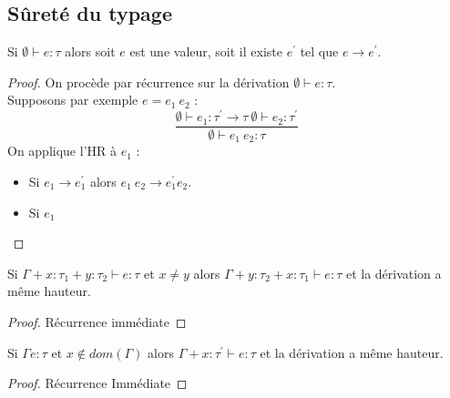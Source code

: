 \documentclass{cours}
\begin{document}
\subsection{Sûreté du typage}
\begin{lemma}[Progression]
    Si $\emptyset \vdash e : \tau$ alors soit $e$ est une valeur, soit il existe $e^{'}$ tel que $e \rightarrow e^{'}$.    
\end{lemma}
\begin{proof}
    On procède par récurrence sur la dérivation $\emptyset \vdash e : \tau$.\\
    Supposons par exemple $e = e_{1} \ e_{2}$ : 
    \[
        \frac{\emptyset \vdash e_{1} : \tau^{'} \rightarrow \tau \ \emptyset \vdash e_{2} : \tau^{'}}{\emptyset \vdash e_{1} \ e_{2} : \tau}
    \]
    On applique l'HR à $e_{1}$ : 
    \begin{itemize}
        \item Si $e_{1} \rightarrow e_{1}^{'}$ alors $e_{1} \ e_{2} \rightarrow e_{1}^{'} e_{2}$. %
        \item Si $e_{1}$
    \end{itemize}
\end{proof}

\begin{lemma}[Permutation]
    Si $\Gamma + x : \tau_{1} + y : \tau_{2} \vdash e : \tau$ et $x \neq y$ alors $\Gamma + y : \tau_{2} + x : \tau_{1} \vdash e : \tau$ et la dérivation a même hauteur.
\end{lemma}
\begin{proof}
    Récurrence immédiate
\end{proof}

\begin{lemma}[Affaiblissement]
    Si $\Gamma e : \tau$ et $x \notin dom(\Gamma)$ alors $\Gamma + x : \tau^{'} \vdash e : \tau$ et la dérivation a même hauteur.
\end{lemma}
\begin{proof}
    Récurrence Immédiate
\end{proof}
\end{document}
